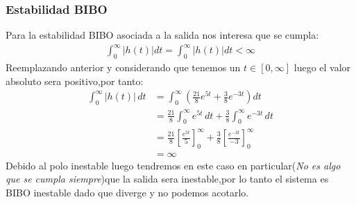 \documentclass[
  11pt,
  letterpaper,
   addpoints,
  ]{exam}
\begin{document}
\begin{questions}
\begin{solution}
    \subsubsection*{Estabilidad BIBO}
    Para la estabilidad BIBO asociada a la salida nos interesa que se cumpla:
    \begin{align}
        \int_{0}^{\infty}|h(t)|dt= \int_{0}^{\infty} |h(t)| dt < \infty
    \end{align}
    Reemplazando anterior y considerando que tenemos un $t \in [0,\infty]$ luego el valor absoluto sera positivo,por tanto:
    \begin{align}
        \int_{0}^{\infty} |h(t)| \, dt &= \int_{0}^{\infty} \left( \frac{21}{8} e^{5t} + \frac{3}{8} e^{-3t} \right) dt \\
        &= \frac{21}{8} \int_{0}^{\infty} e^{5t} \, dt + \frac{3}{8} \int_{0}^{\infty} e^{-3t} \, dt \\
        &= \frac{21}{8} \left[ \frac{e^{5t}}{5} \right]_{0}^{\infty} + \frac{3}{8} \left[ \frac{e^{-3t}}{-3} \right]_{0}^{\infty} \\
        &= \infty
    \end{align}
    Debido al polo inestable luego tendremos en este caso en particular(\textit{No es algo que se cumpla siempre})que la salida sera inestable,por lo tanto el sistema es BIBO inestable dado que diverge y no podemos acotarlo.

\end{solution}
\end{questions}
\end{document}
